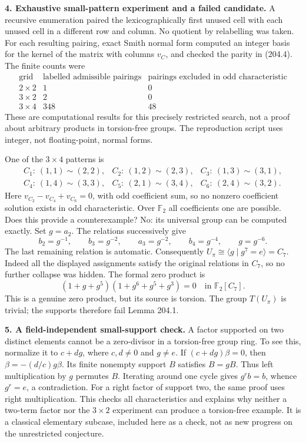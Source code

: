 \documentclass[11pt,a4paper]{article}
\newcommand{\F}{\mathbb{F}}
\begin{document}
\textbf{4. Exhaustive small-pattern experiment and a failed candidate.}
A recursive enumeration paired the lexicographically first unused cell
with each unused cell in a different row and column. No quotient by
relabelling was taken. For each resulting pairing, exact Smith normal
form computed an integer basis for the kernel of the matrix with columns
$v_C$, and checked the parity in (204.4). The finite counts were
\[
\begin{array}{c|r|r}
\text{grid}&\text{labelled admissible pairings}&
\text{pairings excluded in odd characteristic}\\\hline
2\times2&1&0\\
3\times2&2&0\\
3\times4&348&48
\end{array}
\]
These are computational results for this precisely restricted search,
not a proof about arbitrary products in torsion-free groups. The
reproduction script uses integer, not floating-point, normal forms.

One of the $3\times4$ patterns is
\[
\begin{array}{lll}
 C_1:\ (1,1)\sim(2,2),& C_2:\ (1,2)\sim(2,3),&
 C_3:\ (1,3)\sim(3,1),\\
 C_4:\ (1,4)\sim(3,3),& C_5:\ (2,1)\sim(3,4),&
 C_6:\ (2,4)\sim(3,2).
\end{array}
\]
Here $v_{C_2}-v_{C_4}+v_{C_6}=0$, with odd coefficient sum, so no
nonzero coefficient solution exists in odd characteristic. Over $\F_2$
all coefficients one are possible. Does this provide a counterexample?
No: its universal group can be computed exactly. Set $g=a_2$. The
relations successively give
\[
 b_2=g^{-1},\qquad b_3=g^{-2},\qquad a_3=g^{-2},
 \qquad b_4=g^{-4},\qquad g=g^{-6}.
\]
The last remaining relation is automatic. Consequently
$U_\pi\cong\langle g\mid g^7=e\rangle=C_7$. Indeed all the displayed
assignments satisfy the original relations in $C_7$, so no further
collapse was hidden. The formal zero product is
\[
 (1+g+g^5)(1+g^6+g^5+g^3)=0\quad\text{in }\F_2[C_7].
\]
This is a genuine zero product, but its source is torsion. The group
$T(U_\pi)$ is trivial; the supports therefore fail Lemma 204.1.

\textbf{5. A field-independent small-support check.}
A factor supported on two distinct elements cannot be a zero-divisor
in a torsion-free group ring. To see this, normalize it to $c+dg$, where
$c,d\ne0$ and $g\ne e$. If $(c+dg)\beta=0$, then
$\beta=-(d/c)g\beta$. Its finite nonempty support $B$ satisfies
$B=gB$. Thus left multiplication by $g$ permutes $B$. Iterating around
one cycle gives $g^r b=b$, whence $g^r=e$, a contradiction. For a
right factor of support two, the same proof uses right multiplication.
This checks all characteristics and explains why neither a two-term
factor nor the $3\times2$ experiment can produce a torsion-free example.
It is a classical elementary subcase, included here as a check, not as
new progress on the unrestricted conjecture.
\end{document}
